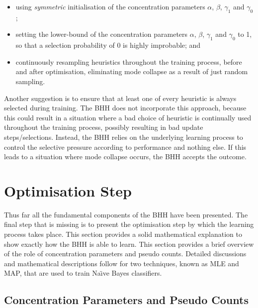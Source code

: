 \begin{itemize}
      \item using \textit{symmetric} initialisation of the concentration parameters $\alpha$, $\beta$, $\gamma_{1}$ and $\gamma_{0}$;

      \item setting the lower-bound of the concentration parameters $\alpha$, $\beta$, $\gamma_{1}$ and $\gamma_{0}$ to 1, so that a selection probability of 0 is highly improbable; and

      \item continuously resampling heuristics throughout the training process, before and after optimisation, eliminating mode collapse as a result of just random sampling.
\end{itemize}

Another suggestion is to ensure that at least one of every heuristic is always selected during training. The \acs{BHH} does not incorporate this approach, because this could result in a situation where a bad choice of heuristic is continually used throughout the training process, possibly resulting in bad update steps/selections. Instead, the \acs{BHH} relies on the underlying learning process to control the selective pressure according to performance and nothing else. If this leads to a situation where mode collapse occurs, the \acs{BHH} accepts the outcome.

\section{Optimisation Step}\label{sec:bhh:optimisation_step}

Thus far all the fundamental components of the \acs{BHH} have been presented. The final step that is missing is to present the optimisation step by which the learning process takes place. This section provides a solid mathematical explanation to show exactly how the \acs{BHH} is able to learn. This section provides a brief overview of the role of concentration parameters and pseudo counts. Detailed discussions and mathematical descriptions follow for two techniques, known as \acs{MLE} and \acs{MAP}, that are used to train Na\"{\i}ve Bayes classifiers.

\subsection{Concentration Parameters and Pseudo Counts}\label{sec:bhh:optimisation_step:concentration_pseudo_counts}

